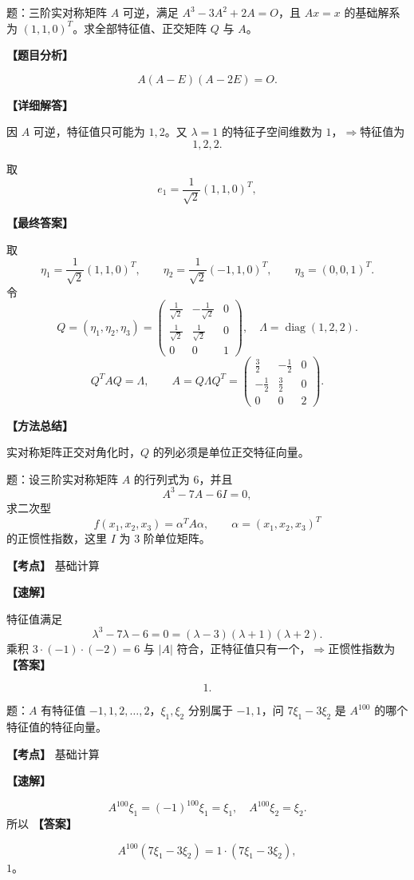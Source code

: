 ﻿\documentclass[11pt,a4paper,UTF8]{ctexart}
\begin{document}
\begin{answerbox}
题：三阶实对称矩阵 $A$ 可逆，满足 $A^3-3A^2+2A=O$，且 $Ax=x$ 的基础解系为 $(1,1,0)^T$。求全部特征值、正交矩阵 $Q$ 与 $A$。

\textbf{【题目分析】}

\[A(A-E)(A-2E)=O.\]

\textbf{【详细解答】}

因 $A$ 可逆，特征值只可能为 $1,2$。又 $\lambda=1$ 的特征子空间维数为 $1$，$\Rightarrow$特征值为
\[1,2,2.\]

取
\[e_1=\frac1{\sqrt2}(1,1,0)^T,\]

\textbf{【最终答案】}

取
\[
\eta_1=\frac1{\sqrt2}(1,1,0)^T,\qquad
\eta_2=\frac1{\sqrt2}(-1,1,0)^T,\qquad
\eta_3=(0,0,1)^T.
\]
令
\[
Q=(\eta_1,\eta_2,\eta_3)=
\begin{pmatrix}
\frac1{\sqrt2}&-\frac1{\sqrt2}&0\\
\frac1{\sqrt2}&\frac1{\sqrt2}&0\\
0&0&1
\end{pmatrix},
\quad
\Lambda=\operatorname{diag}(1,2,2).
\]
\[
Q^TAQ=\Lambda,\qquad
A=Q\Lambda Q^T=
\begin{pmatrix}
\frac32&-\frac12&0\\
-\frac12&\frac32&0\\
0&0&2
\end{pmatrix}.
\]

\textbf{【方法总结】}

实对称矩阵正交对角化时，\(Q\) 的列必须是单位正交特征向量。
\end{answerbox}
\begin{answerbox}[2024--2025 填空 3]
题：设三阶实对称矩阵 $A$ 的行列式为 $6$，并且
\[
A^3-7A-6I=0,
\]
求二次型
\[
f(x_1,x_2,x_3)=\alpha^TA\alpha,\qquad \alpha=(x_1,x_2,x_3)^T
\]
的正惯性指数，这里 $I$ 为 $3$ 阶单位矩阵。

\textbf{【考点】} 基础计算

\textbf{【速解】}

特征值满足
\[\lambda^3-7\lambda-6=0=(\lambda-3)(\lambda+1)(\lambda+2).\]
乘积 $3\cdot(-1)\cdot(-2)=6$ 与 $|A|$ 符合，正特征值只有一个，$\Rightarrow$正惯性指数为
\textbf{【答案】}

\[1.\]
\end{answerbox}
\begin{answerbox}[2024--2025 填空 6]
题：$A$ 有特征值 $-1,1,2,\ldots,2$，$\xi_1,\xi_2$ 分别属于 $-1,1$，问 $7\xi_1-3\xi_2$ 是 $A^{100}$ 的哪个特征值的特征向量。

\textbf{【考点】} 基础计算

\textbf{【速解】}

\[A^{100}\xi_1=(-1)^{100}\xi_1=\xi_1,\quad A^{100}\xi_2=\xi_2.\]
所以
\textbf{【答案】}

\[A^{100}(7\xi_1-3\xi_2)=1\cdot(7\xi_1-3\xi_2),\]
 $1$。
\end{answerbox}
\end{document}
